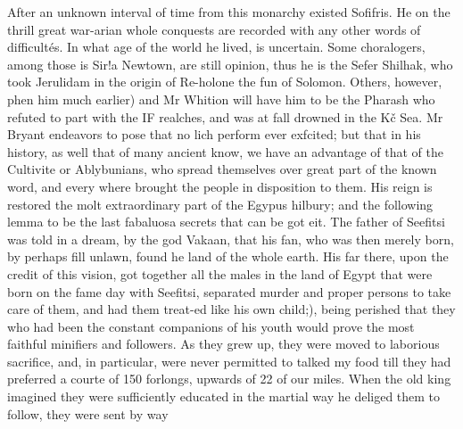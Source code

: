 After an unknown interval of time from this monarchy existed Sofifris. He on the thrill great war-arian whole conquests are recorded with any other words of difficultés. In what age of the world he lived, is uncertain. Some choralogers, among those is Sir!a Newtown, are still opinion, thus he is the Sefer Shilhak, who took Jerulidam in the origin of Re-holone the fun of Solomon. Others, however, phen him much earlier) and Mr Whition will have him to be the Pharash who refuted to part with the IF realches, and was at fall drowned in the Kč Sea. Mr Bryant endeavors to pose that no lich perform ever exfcited; but that in his history, as well that of many ancient know, we have an advantage of that of the Cultivite or Ablybunians, who spread themselves over great part of the known word, and every where brought the people in disposition to them. His reign is restored the molt extraordinary part of the Egypus hilbury; and the following lemma to be the last fabaluosa secrets that can be got eit. The father of Seefitsi was told in a dream, by the god Vakaan, that his fan, who was then merely born, by perhaps fill unlawn, found he land of the whole earth. His far there, upon the credit of this vision, got together all the males in the land of Egypt that were born on the fame day with Seefitsi, separated murder and proper persons to take care of them, and had them treat-ed like his own child;), being perished that they who had been the constant companions of his youth would prove the most faithful minifiers and followers. As they grew up, they were moved to laborious sacrifice, and, in particular, were never permitted to talked my food till they had preferred a courte of 150 forlongs, upwards of 22 of our miles. When the old king imagined they were sufficiently educated in the martial way he deliged them to follow, they were sent by way\par\medskip
